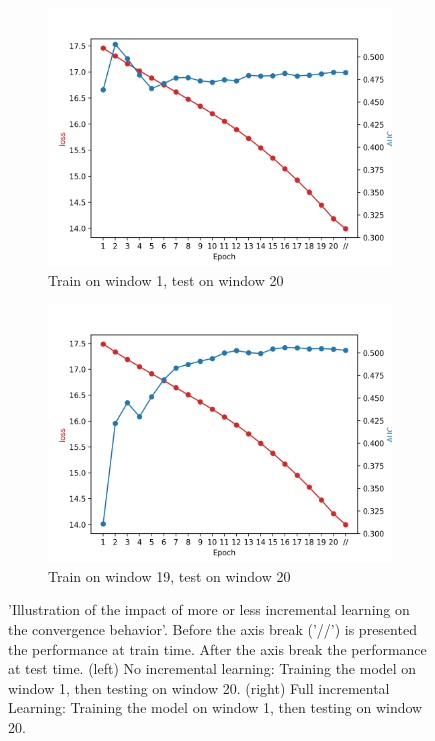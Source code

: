 \begin{figure}[htbp!]
     \centering
     \begin{subfigure}[b]{0.5\textwidth}
         \centering
         \includegraphics[width=\textwidth]{images/plots/train1_test20.png}
         \caption{Train on window 1, test on window 20}
         \label{fig:train_1_test_20}
     \end{subfigure}
     \hfill
     \begin{subfigure}[b]{0.5\textwidth}
         \centering
         \includegraphics[width=\textwidth]{images/plots/train19_test20.png}
         \caption{Train on window 19, test on window 20}
         \label{fig:train_19_test_20}
     \end{subfigure}
    \caption{'Illustration of the impact of more or less incremental learning on the convergence behavior'.  Before  the axis break ('//') is presented the performance at train time. After the axis break the performance at test time.
    (left) No incremental learning: Training the model on window 1, then testing on window 20.
    (right) Full incremental Learning: Training the model on window 1, then testing on window 20.}
    \label{fig:comparison_concept_drift}
\end{figure}

